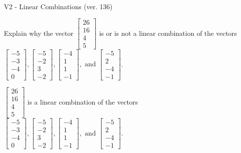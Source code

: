 \begin{exercise}
  \begin{exerciseTitle}V2 - Linear Combinations (ver. 136)\end{exerciseTitle}
  \begin{exerciseStatement}
    Explain why the vector \(\left[\begin{array}{c}
26 \\
16 \\
4 \\
5
\end{array}\right]\)  is or is not a linear 
	combination of the vectors \(\left[\begin{array}{c}
-5 \\
-3 \\
-4 \\
0
\end{array}\right] , \left[\begin{array}{c}
-5 \\
-2 \\
3 \\
-2
\end{array}\right] , \left[\begin{array}{c}
-4 \\
1 \\
1 \\
-1
\end{array}\right] , \text{ and } \left[\begin{array}{c}
-5 \\
2 \\
-4 \\
-1
\end{array}\right]\).
	


  \end{exerciseStatement}
  \begin{exerciseAnswer}
   \(\left[\begin{array}{c}
26 \\
16 \\
4 \\
5
\end{array}\right]\) 
  	 is  
	a linear combination of the vectors \(\left[\begin{array}{c}
-5 \\
-3 \\
-4 \\
0
\end{array}\right] , \left[\begin{array}{c}
-5 \\
-2 \\
3 \\
-2
\end{array}\right] , \left[\begin{array}{c}
-4 \\
1 \\
1 \\
-1
\end{array}\right] , \text{ and } \left[\begin{array}{c}
-5 \\
2 \\
-4 \\
-1
\end{array}\right]\).


\end{exerciseAnswer}
\end{exercise}
